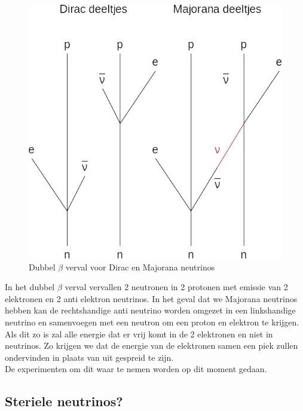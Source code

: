 \documentclass[../main.tex]{subfiles}
\begin{document}
\begin{figure}[h]
    \centering
    \includegraphics[width=0.5\linewidth]{neutrinos/dubbel_beta_verval.jpg}
    \caption{Dubbel $\beta$ verval voor Dirac en Majorana neutrinos}%
    \label{fig:neutrinos/dubbel_beta_verval}
\end{figure}

In het dubbel $\beta$ verval vervallen 2 neutronen in 2 protonen met emissie van 2 elektronen en 2 anti elektron neutrinos. In het geval dat we Majorana neutrinos hebben kan de rechtshandige anti neutrino worden omgezet in een linkshandige neutrino en samenvoegen met een neutron om een proton en elektron te krijgen. Als dit zo is zal alle energie dat er vrij komt in de 2 elektronen en niet in neutrinos. Zo krijgen we dat de energie van de elektronen samen een piek zullen ondervinden in plaats van uit gespreid te zijn.\\
De experimenten om dit waar te nemen worden op dit moment gedaan.

\subsection{Steriele neutrinos?}%
\label{sub:steriele_neutrinos_}
\end{document}

